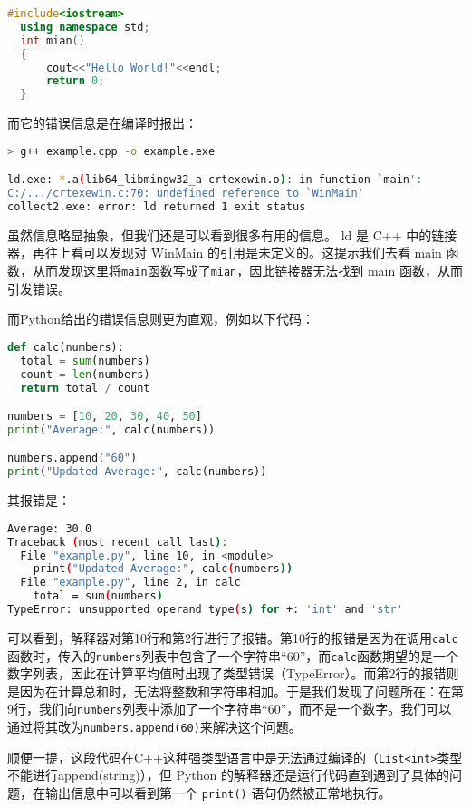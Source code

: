 \documentclass[../main.tex]{subfiles}
\begin{document}
\begin{lstlisting}[language=C++]
  #include<iostream>
  using namespace std;
  int mian()
  {
      cout<<"Hello World!"<<endl;
      return 0;
  }
\end{lstlisting}

而它的错误信息是在编译时报出：

\begin{lstlisting}[language=bash]
> g++ example.cpp -o example.exe

ld.exe: *.a(lib64_libmingw32_a-crtexewin.o): in function `main':
C:/.../crtexewin.c:70: undefined reference to `WinMain'
collect2.exe: error: ld returned 1 exit status
\end{lstlisting}

虽然信息略显抽象，但我们还是可以看到很多有用的信息。 ld 是 C++ 中的链接器，再往上看可以发现对 WinMain 的引用是未定义的。这提示我们去看 main 函数，从而发现这里将\texttt{main}函数写成了\texttt{mian}，因此链接器无法找到 main 函数，从而引发错误。

而Python给出的错误信息则更为直观，例如以下代码：

\begin{lstlisting}[language=Python]
def calc(numbers):
  total = sum(numbers)
  count = len(numbers)
  return total / count

numbers = [10, 20, 30, 40, 50]
print("Average:", calc(numbers))

numbers.append("60")
print("Updated Average:", calc(numbers))
\end{lstlisting}

其报错是：
\begin{lstlisting}[language=bash]
Average: 30.0
Traceback (most recent call last):
  File "example.py", line 10, in <module>
    print("Updated Average:", calc(numbers))
  File "example.py", line 2, in calc
    total = sum(numbers)
TypeError: unsupported operand type(s) for +: 'int' and 'str'
\end{lstlisting}

可以看到，解释器对第10行和第2行进行了报错。第10行的报错是因为在调用\texttt{calc}函数时，传入的\texttt{numbers}列表中包含了一个字符串“60”，而\texttt{calc}函数期望的是一个数字列表，因此在计算平均值时出现了类型错误（TypeError）。而第2行的报错则是因为在计算总和时，无法将整数和字符串相加。于是我们发现了问题所在：在第9行，我们向\texttt{numbers}列表中添加了一个字符串“60”，而不是一个数字。我们可以通过将其改为\texttt{numbers.append(60)}来解决这个问题。

顺便一提，这段代码在C++这种强类型语言中是无法通过编译的（\texttt{List<int>}类型不能进行append(string)），但 Python 的解释器还是运行代码直到遇到了具体的问题，在输出信息中可以看到第一个 \texttt{print()} 语句仍然被正常地执行。
\end{document}
